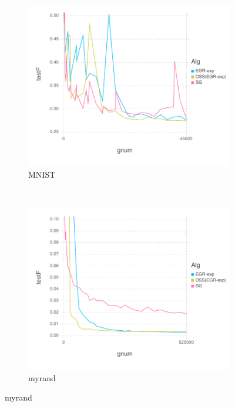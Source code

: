 \documentclass[11pt]{article}
\begin{document}
   \begin{figure}[H]
       \centering
       \begin{subfigure}[b]{0.45\textwidth}
           \includegraphics[width=\textwidth]{Figures/MNISTBLtrueFfFinal-dss.pdf}
           \caption{MNIST}
       \end{subfigure}
       ~ %
         \begin{subfigure}[b]{0.45\textwidth}
           \includegraphics[width=\textwidth]{Figures/myrandBLtrueFfFinal-dss.pdf}
             \caption{myrand}
         \end{subfigure}
		 

\end{figure}
\end{document}

